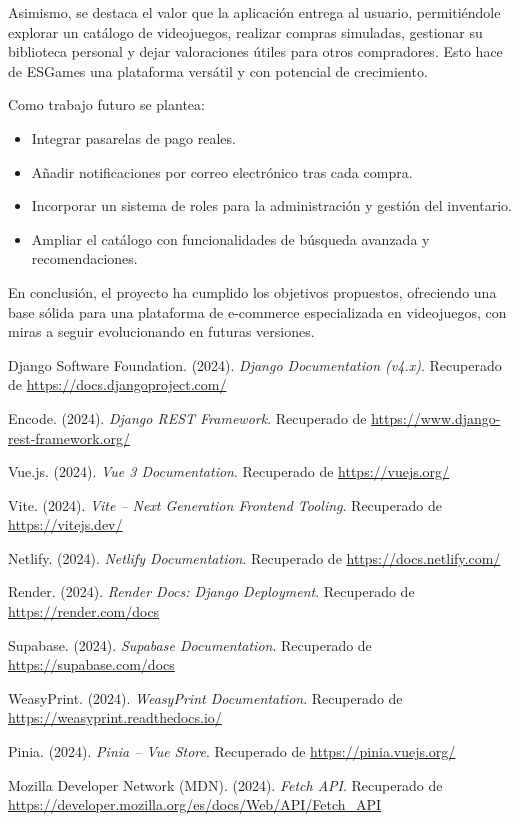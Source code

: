 \documentclass{article}
\begin{document}
Asimismo, se destaca el valor que la aplicación entrega al usuario, permitiéndole explorar un catálogo de videojuegos, realizar compras simuladas, gestionar su biblioteca personal y dejar valoraciones útiles para otros compradores. Esto hace de ESGames una plataforma versátil y con potencial de crecimiento.

Como trabajo futuro se plantea:

\begin{itemize}
    \item Integrar pasarelas de pago reales.
    \item Añadir notificaciones por correo electrónico tras cada compra.
    \item Incorporar un sistema de roles para la administración y gestión del inventario.
    \item Ampliar el catálogo con funcionalidades de búsqueda avanzada y recomendaciones.
\end{itemize}

En conclusión, el proyecto ha cumplido los objetivos propuestos, ofreciendo una base sólida para una plataforma de e-commerce especializada en videojuegos, con miras a seguir evolucionando en futuras versiones.



\begin{thebibliography}{99}

Django Software Foundation. (2024). \textit{Django Documentation (v4.x)}. Recuperado de \url{https://docs.djangoproject.com/}

Encode. (2024). \textit{Django REST Framework}. Recuperado de \url{https://www.django-rest-framework.org/}

Vue.js. (2024). \textit{Vue 3 Documentation}. Recuperado de \url{https://vuejs.org/}

Vite. (2024). \textit{Vite – Next Generation Frontend Tooling}. Recuperado de \url{https://vitejs.dev/}

Netlify. (2024). \textit{Netlify Documentation}. Recuperado de \url{https://docs.netlify.com/}

Render. (2024). \textit{Render Docs: Django Deployment}. Recuperado de \url{https://render.com/docs}

Supabase. (2024). \textit{Supabase Documentation}. Recuperado de \url{https://supabase.com/docs}

WeasyPrint. (2024). \textit{WeasyPrint Documentation}. Recuperado de \url{https://weasyprint.readthedocs.io/}

Pinia. (2024). \textit{Pinia – Vue Store}. Recuperado de \url{https://pinia.vuejs.org/}

Mozilla Developer Network (MDN). (2024). \textit{Fetch API}. Recuperado de \url{https://developer.mozilla.org/es/docs/Web/API/Fetch_API}

\end{thebibliography}

	
%
%
%
			
\end{document}
